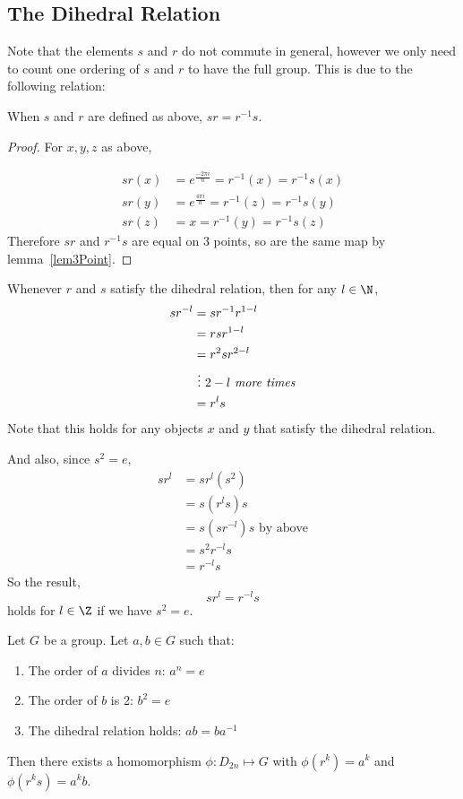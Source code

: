 \documentclass[../Main.tex]{subfiles}
\begin{document}
\subsection{The Dihedral Relation}
Note that the elements $s$ and $r$ do not commute in general, however we only need to count one ordering of $s$ and $r$ to have the full group. This is due to the following relation:
\begin{lemma}
    When $s$ and $r$ are defined as above, $sr = r^{-1} s$.
    \label{lemDihedralRelation}
\end{lemma}
\begin{proof}
    For $x, y, z$ as above,\par
    \begin{align*}
        sr(x) &= e^\frac{-2 \pi i}{n} = r^{-1}(x) = r^{-1} s(x) \\
        sr(y) &= e^\frac{4 \pi i}{n} = r^{-1}(z) = r^{-1} s(y) \\
        sr(z) &= x = r^{-1}(y) = r^{-1} s(z)
    \end{align*}
    Therefore $sr$ and $r^{-1} s$ are equal on 3 points, so are the same map by lemma~\ref{lem3Point}.
\end{proof}
Whenever $r$ and $s$ satisfy the dihedral relation, then for any $l \in \N$,
\begin{align*}
    s r^{-l} &= sr^{-1} r^{1-l} \\
    &= rsr^{1-l} \\
    &= r^2 sr^{2-l} \\
    &~\vdots~2-l \text{ \textit{more times}} \\
    &= r^l s
\end{align*}
Note that this holds for any objects $x$ and $y$ that satisfy the dihedral relation.\par
And also, since $s^2 = e$,
\begin{align*}
    sr^l &= sr^l (s^2) \\
    &= s (r^l s) s \\
    &= s (s r^{-l}) s \text{ by above} \\
    &= s^2 r^{-l} s \\
    &= r^{-l} s
\end{align*}
So the result,
\begin{equation}
    sr^l = r^{-l} s
    \label{eqnExtendedDihedral}
\end{equation}
holds for $l \in \Z$ if we have $s^2 = e$.
\begin{lemma}
    Let $G$ be a group. Let $a, b \in G$ such that:
    \begin{enumerate}
        \item The order of $a$ divides $n$: $a^n = e$
        \item The order of $b$ is 2: $b^2 = e$
        \item The dihedral relation holds: $ab = ba^{-1}$
    \end{enumerate}
    Then there exists a homomorphism $\phi : D_{2n} \mapsto G$ with $\phi(r^k) = a^k$ and $\phi(r^k s) = a^k b$.
    \label{lemD2nHomomorphism}
\end{lemma}
\end{document}
